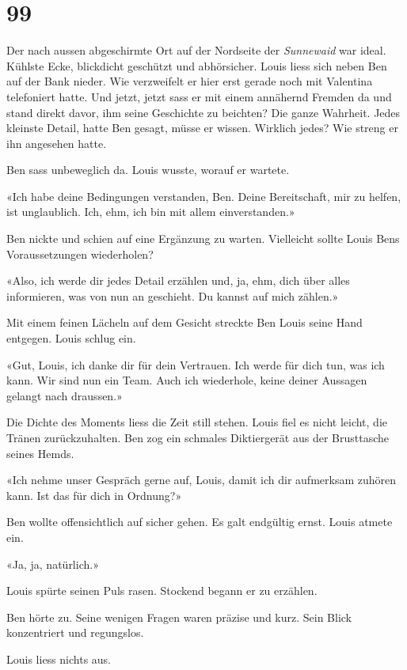 \chapter{99}

Der nach aussen abgeschirmte Ort auf der Nordseite der \emph{Sunnewaid}
war ideal. Kühlste Ecke, blickdicht geschützt und abhörsicher.
Louis liess sich neben Ben auf der Bank nieder. Wie verzweifelt er hier
erst gerade noch mit Valentina telefoniert hatte. Und jetzt, jetzt sass
er mit einem annähernd Fremden da und stand direkt davor, ihm seine
Geschichte zu beichten? Die ganze Wahrheit. Jedes kleinste Detail, hatte
Ben gesagt, müsse er wissen. Wirklich jedes? Wie streng er ihn angesehen
hatte.

Ben sass unbeweglich da. Louis wusste, worauf er wartete.

«Ich habe deine Bedingungen verstanden, Ben. Deine Bereitschaft, mir zu
helfen, ist unglaublich. Ich, ehm, ich bin mit allem einverstanden.»

Ben nickte und schien auf eine Ergänzung zu warten.
Vielleicht sollte Louis Bens Voraussetzungen wiederholen?

«Also, ich werde dir jedes Detail erzählen und, ja, ehm, dich über alles
informieren, was von nun an geschieht. Du kannst auf mich zählen.»

Mit einem feinen Lächeln auf dem Gesicht streckte Ben Louis seine Hand 
entgegen. Louis schlug ein.

«Gut, Louis, ich danke dir für dein Vertrauen. Ich werde für dich tun,
was ich kann. Wir sind nun ein Team. Auch ich wiederhole, keine deiner
Aussagen gelangt nach draussen.»

Die Dichte des Moments liess die Zeit still stehen. Louis fiel es nicht leicht, die Tränen zurückzuhalten. 
Ben zog ein schmales Diktiergerät aus der Brusttasche seines Hemds.

«Ich nehme unser Gespräch gerne auf, Louis, damit ich dir aufmerksam
zuhören kann. Ist das für dich in Ordnung?»

Ben wollte offensichtlich auf sicher gehen. Es galt endgültig ernst.
Louis atmete ein.

«Ja, ja, natürlich.»

Louis spürte seinen Puls rasen. Stockend begann er zu erzählen.

Ben hörte zu. Seine wenigen Fragen waren präzise und kurz. Sein Blick
konzentriert und regungslos.

Louis liess nichts aus.
